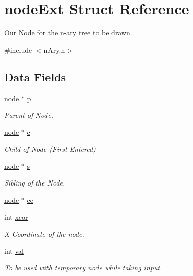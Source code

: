 \hypertarget{structnode_ext}{}\section{node\+Ext Struct Reference}
\label{structnode_ext}


Our Node for the n-\/ary tree to be drawn.  




{\ttfamily \#include $<$n\+Ary.\+h$>$}

\subsection*{Data Fields}
\begin{DoxyCompactItemize}
\item 
\hyperlink{binary_tree_w_s_8h_aafd781b4673cf2585cd9a156aebd08de}{node} $\ast$ \hyperlink{structnode_ext_aa2a7d0665dce0c3fa1ecca4d1ebbce5c}{p}
\begin{DoxyCompactList}\small\item\em Parent of Node. \end{DoxyCompactList}\item 
\hyperlink{binary_tree_w_s_8h_aafd781b4673cf2585cd9a156aebd08de}{node} $\ast$ \hyperlink{structnode_ext_a44d30df24bbed2d24c5a7fd2987c871f}{c}
\begin{DoxyCompactList}\small\item\em Child of Node (First Entered) \end{DoxyCompactList}\item 
\hyperlink{binary_tree_w_s_8h_aafd781b4673cf2585cd9a156aebd08de}{node} $\ast$ \hyperlink{structnode_ext_aa51f6e5e2586b1bc1bcc7204c69a8e10}{s}
\begin{DoxyCompactList}\small\item\em Sibling of the Node. \end{DoxyCompactList}\item 
\hyperlink{binary_tree_w_s_8h_aafd781b4673cf2585cd9a156aebd08de}{node} $\ast$ \hyperlink{structnode_ext_a51e8c776c6bd5730032a988f3265fd7b}{ce}
\item 
int \hyperlink{structnode_ext_a4958a7b7ca6a973f7983d0ef569da832}{xcor}
\begin{DoxyCompactList}\small\item\em X Coordinate of the node. \end{DoxyCompactList}\item 
int \hyperlink{structnode_ext_aa0ccb5ee6d882ee3605ff47745c6467b}{val}
\begin{DoxyCompactList}\small\item\em To be used with temporary node while taking input. \end{DoxyCompactList}\item 

\end{DoxyCompactItemize}

